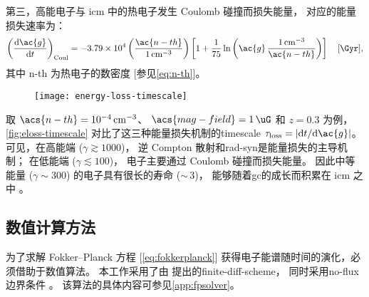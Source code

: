 第三，高能电子与 \ac{icm} 中的热电子发生 Coulomb 碰撞而损失能量，
对应的能量损失速率为：
\begin{equation}
  \label{eq:eloss-coul}
  \left( \diff{\ac{g}}{t} \right)_{\R{Coul}} =
    \num{-3.79e4} \left( \frac{\ac{n-th}}{\SI{1}{\per\cm\cubed}} \right)
    \left[ 1 + \frac{1}{75} \ln \left(
        \ac{g}\,\frac{\SI{1}{\per\cm\cubed}}{\ac{n-th}} \right) \right]
    \quad [\si{\per\Gyr}] ,
\end{equation}
其中 \ac{n-th} 为热电子的数密度 [参见\autoref{eq:n-th}]。

\begin{figure}[htp]
  \centering
  \texttt{[image: energy-loss-timescale]}
  \label{fig:eloss-timescale}
\end{figure}

取 $\acs{n-th} = \SI{e-4}{\per\cubic\cm}$、
$\acs{mag-field} = \SI{1}{\uG}$ 和 $z = 0.3$ 为例，
\autoref{fig:eloss-timescale} 对比了这三种能量损失机制的\ac{timescale}
$\tau_{\R{loss}} = |\D{t}/\D{\ac{g}}|$。
可见，在高能端 ($\gamma \gtrsim 1000$)，
逆 Compton 散射和\ac{rad-syn}是能量损失的主导机制；
在低能端 ($\gamma \lesssim 100$)，
电子主要通过 Coulomb 碰撞而损失能量。
因此中等能量 ($\gamma \sim 300$) 的电子具有很长的寿命 ($\sim$\,\SI{3}{\Gyr})，
能够随着\ac{gc}的成长而积累在 \ac{icm} 之中 \cite{sarazin1999}。

\subsection{数值计算方法}
\label{sec:numerical}

为了求解 Fokker--Planck 方程 [\autoref{eq:fokkerplanck}]
获得电子能谱随时间的演化，必须借助于数值算法。
本工作采用了由  提出的\ac{finite-diff-scheme}，
同时采用\ac{no-flux}边界条件 \cite{park1996}。
该算法的具体内容可参见\autoref{app:fpsolver}。

